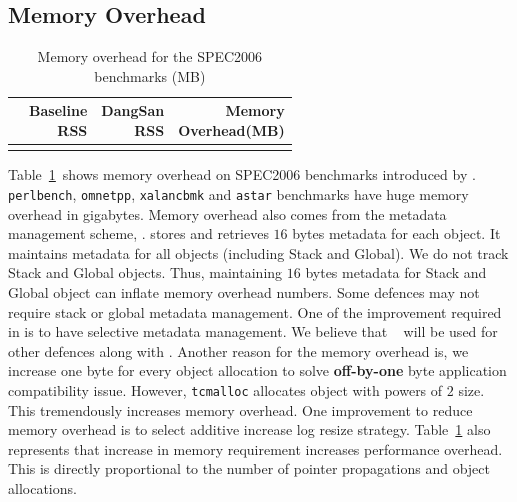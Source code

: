 \subsection{Memory Overhead}  
\begin{table}[t]
\center
\begin{tabular}{l|*{3}{r}}
	\toprule
	\tablecell{Benchmarks} & \tablecell{Baseline \\RSS} & \tablecell{DangSan \\RSS} & \tablecell{Memory \\Overhead(MB)} \\
	\toprule
	\csvreader[head to column names]{Tables/spec_memory.csv}{}
	{\\\benchmarks & \baselinerss & \dangrss & \extramemory} \\%
	\bottomrule
\end{tabular}
\caption{Memory overhead for the SPEC2006 benchmarks (MB)}
\label{table:spec_memory}
\end{table}

Table~\ref{table:spec_memory}\ shows memory overhead on SPEC2006 benchmarks introduced by \projectname{}. \texttt{perlbench}, \texttt{omnetpp}, \texttt{xalancbmk} and \texttt{astar} benchmarks have huge memory overhead in gigabytes. Memory overhead also comes from the metadata management scheme, \metalloc{}. \metalloc{} stores and retrieves $16$ bytes metadata for each object. It maintains metadata for all objects (including Stack and Global). We do not track Stack and Global objects. Thus, maintaining $16$ bytes metadata for Stack and Global object can inflate memory overhead numbers. Some defences may not require stack or global metadata management. One of the improvement required in \metalloc{} is to have selective metadata management. We believe that ~\metalloc{} will be used for other defences along with \projectname{}. Another reason for the memory overhead is, we increase one byte for every object allocation to solve \textbf{off-by-one} byte application compatibility issue. However, \texttt{tcmalloc} allocates object with powers of $2$ size. This tremendously increases memory overhead. One improvement to reduce memory overhead is to select additive increase log resize strategy. Table~\ref{table:spec_memory} also represents that increase in memory requirement increases performance overhead. This is directly proportional to the number of pointer propagations and object allocations. 